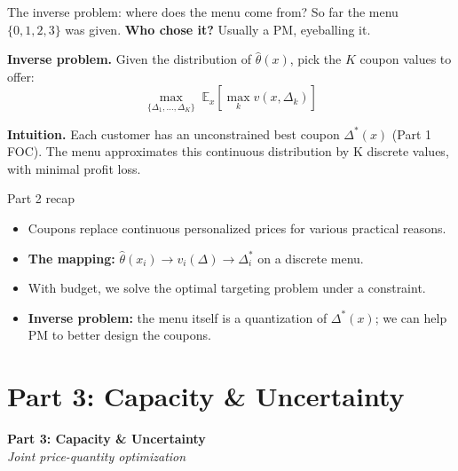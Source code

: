 \documentclass[aspectratio=169, 11pt, handout]{beamer}
\newcommand{\E}{\mathbb{E}}
\begin{document}
\begin{frame}{The inverse problem: where does the menu come from?}
So far the menu $\{0, 1, 2, 3\}$ was given. \textbf{Who chose it?} Usually a PM, eyeballing it.

\bigskip

\textbf{Inverse problem.} Given the distribution of $\hat\theta(x)$, pick the $K$ coupon values to offer:
\[
\max_{\{\Delta_1, \ldots, \Delta_K\}} \; \E_{x}\!\left[ \max_{k} v(x, \Delta_k) \right]
\]

\bigskip

\textbf{Intuition.} Each customer has an unconstrained best coupon $\Delta^*(x)$ (Part 1 FOC). The menu approximates this continuous distribution by K discrete values, with minimal profit loss.

\end{frame}

\begin{frame}{Part 2 recap}
\begin{itemize}
    \item Coupons replace continuous personalized prices for various practical reasons.
    \item \textbf{The mapping:} $\hat\theta(x_i) \to v_i(\Delta) \to \Delta_i^*$ on a discrete menu.
    \item With budget, we solve the optimal targeting problem under a constraint.
    \item \textbf{Inverse problem:} the menu itself is a quantization of $\Delta^*(x)$; we can help PM to better design the coupons.
\end{itemize}

\end{frame}


\section{Part 3: Capacity \& Uncertainty}

\begin{frame}
    \centering
    \vfill
    {\LARGE \textcolor{abnbred}{\textbf{Part 3: Capacity \& Uncertainty}}}\\[0.8em]
    {\small \itshape Joint price-quantity optimization}
    \vfill
\end{frame}
\end{document}
